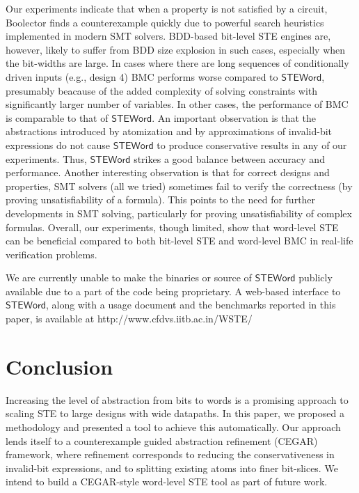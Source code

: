 \documentclass{llncs}
\newcommand{\steword}{\ensuremath{\mathsf{STEWord}}}
\begin{document}
Our experiments indicate that when a property is not satisfied by a
circuit, Boolector finds a counterexample quickly due to powerful
search heuristics implemented in modern SMT solvers.  BDD-based
bit-level STE engines are, however, likely to suffer from BDD size
explosion in such cases, especially when the bit-widths are large.  In
cases where there are long sequences of conditionally driven inputs
(e.g., design 4) BMC performs worse compared to {\steword}, presumably
beacause of the added complexity of solving constraints with
significantly larger number of variables.  In other cases, the
performance of BMC is comparable to that of {\steword}.  An important
observation is that the abstractions introduced by atomization and by
approximations of invalid-bit expressions do not cause {\steword} to
produce conservative results in any of our experiments.  Thus,
{\steword} strikes a good balance between accuracy and performance.
Another interesting observation is that for correct designs and
properties, SMT solvers (all we tried) sometimes fail to verify the
correctness (by proving unsatisfiability of a formula).  This points
to the need for further developments in SMT solving, particularly for
proving unsatisfiability of complex formulas.  Overall, our
experiments, though limited, show that word-level STE can be
beneficial compared to both bit-level STE and word-level BMC in
real-life verification problems.

We are currently unable to make the binaries or source of {\steword}
publicly available due to a part of the code being proprietary.  A
web-based interface to {\steword}, along with a usage document and the
benchmarks reported in this paper, is available at
http://www.cfdvs.iitb.ac.in/WSTE/

\section{Conclusion}\label{sec:conclusion}
Increasing the level of abstraction from bits to words is a promising
approach to scaling STE to large designs with wide datapaths.  In this
paper, we proposed a methodology and presented a tool to achieve this
automatically.  Our approach lends itself to a
counterexample guided abstraction refinement (CEGAR) framework, where
refinement corresponds to reducing the conservativeness in invalid-bit
expressions, and to splitting existing atoms into finer bit-slices.
We intend to build a CEGAR-style word-level STE tool as part of future
work.
\end{document}

